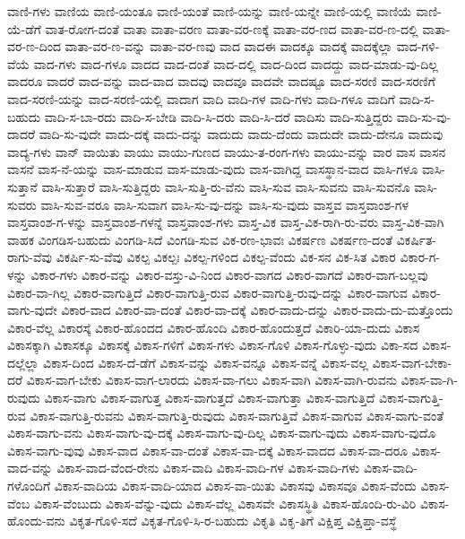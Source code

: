 {ವಾಣಿ-ಗಳು
ವಾಣಿಯ
ವಾಣಿ-ಯಂತೂ
ವಾಣಿ-ಯಂತೆ
ವಾಣಿ-ಯನ್ನು
ವಾಣಿ-ಯನ್ನೇ
ವಾಣಿ-ಯಲ್ಲಿ
ವಾಣಿಯೆ
ವಾಣಿ-ಯೆ-ಡೆಗೆ
ವಾತ-ರೋಗ-ದಂತೆ
ವಾತಾ
ವಾತಾ-ವರಣ
ವಾತಾ-ವರ-ಣಕ್ಕೆ
ವಾತಾ-ವರ-ಣದ
ವಾತಾ-ವರ-ಣ-ದಲ್ಲಿ
ವಾತಾ-ವರ-ಣ-ದಿಂದ
ವಾತಾ-ವರ-ಣ-ವನ್ನು
ವಾತಾ-ವರ-ಣವು
ವಾದ
ವಾದಈ
ವಾದಕ್ಕೂ
ವಾದಕ್ಕೆ
ವಾದಕ್ಕೆಲ್ಲಾ
ವಾದ-ಗಳಿ-ವೆಯೆ
ವಾದ-ಗಳು
ವಾದ-ಗಳೂ
ವಾದದ
ವಾದ-ದಂತೆ
ವಾದ-ದಲ್ಲಿ
ವಾದ-ದಿಂದ
ವಾದದ್ದು
ವಾದ-ಮಾಡು-ವು-ದಿಲ್ಲ
ವಾದರೂ
ವಾದರೆ
ವಾದ-ವನ್ನು
ವಾದ-ವಾದ
ವಾದವು
ವಾದವೂ
ವಾದವೇ
ವಾದಷ್ಟೂ
ವಾದ-ಸರಣಿ
ವಾದ-ಸರಣಿಗೆ
ವಾದ-ಸರಣಿ-ಯನ್ನು
ವಾದ-ಸರಣಿ-ಯಲ್ಲಿ
ವಾದಾಗ
ವಾದಿ
ವಾದಿ-ಗಳ
ವಾದಿ-ಗಳು
ವಾದಿ-ಗಳೂ
ವಾದಿಗೆ
ವಾದಿ-ಸ-ಬಹುದು
ವಾದಿ-ಸ-ಬಾ-ರದು
ವಾದಿ-ಸ-ಬೇಡಿ
ವಾದಿ-ಸಿ-ದರು
ವಾದಿ-ಸಿ-ದರೆ
ವಾದಿಸು
ವಾದಿ-ಸುತ್ತಿದ್ದರು
ವಾದಿ-ಸು-ವು-ದಾದರೆ
ವಾದಿ-ಸು-ವುದೇ
ವಾದು-ದಕ್ಕೆ
ವಾದು-ದನ್ನು
ವಾದುದು
ವಾದು-ದೆಂದು
ವಾದುದೇ
ವಾದು-ದೇನೂ
ವಾದುವು
ವಾದ್ಯ-ಗಳು
ವಾನ್
ವಾಯಿತು
ವಾಯು
ವಾಯು-ಗುಣದ
ವಾಯು-ತ-ರಂಗ-ಗಳು
ವಾಯು-ವನ್ನು
ವಾರ
ವಾಸ
ವಾಸನ
ವಾಸನೆ
ವಾಸ-ನೆ-ಯನ್ನು
ವಾಸ-ಮಾಡುವ
ವಾಸ-ಮಾಡು-ವುದು
ವಾಸ-ವಾಗಿದ್ದ
ವಾಸಸ್ಥಾನ-ವಾದ
ವಾಸಿ-ಗಳೂ
ವಾಸಿ-ಸುತ್ತಾನೆ
ವಾಸಿ-ಸುತ್ತಾರೆ
ವಾಸಿ-ಸುತ್ತಿದ್ದರು
ವಾಸಿ-ಸುತ್ತಿ-ರು-ವೆನು
ವಾಸಿ-ಸುವ
ವಾಸಿ-ಸುವನು
ವಾಸಿ-ಸುವನೊ
ವಾಸಿ-ಸುವರು
ವಾಸಿ-ಸುವ-ವರೂ
ವಾಸಿ-ಸುವಾಗ
ವಾಸಿ-ಸು-ವು-ದನ್ನು
ವಾಸಿ-ಸು-ವುದು
ವಾಸ್ತವ
ವಾಸ್ತವಾಂಶ-ಗಳ
ವಾಸ್ತವಾಂಶ-ಗ-ಳನ್ನು
ವಾಸ್ತವಾಂಶ-ಗಳನ್ನೆ
ವಾಸ್ತವಾಂಶ-ಗಳು
ವಾಸ್ತ-ವಿಕ
ವಾಸ್ತ-ವಿಕ-ರಾಗಿ-ರು-ವರು
ವಾಸ್ತ-ವಿಕ-ವಾಗಿ
ವಾಹಕ
ವಿಂಗಡಿಸ-ಬಹುದು
ವಿಂಗಡಿ-ಸಿದೆ
ವಿಂಗಡಿ-ಸುವ
ವಿಕ-ರಣ-ಭಾವಃ
ವಿಕರ್ಷಣ
ವಿಕರ್ಷಣ-ದಂತೆ
ವಿಕರ್ಷಿತ-ರಾಗು-ವೆವು
ವಿಕರ್ಷಿ-ಸು-ವೆವು
ವಿಕಲ್ಪ
ವಿಕಲ್ಪಃ
ವಿಕಲ್ಪ-ಗಳಿಂದ
ವಿಕಲ್ಪ-ವೆಂದು
ವಿಕ-ಸನ
ವಿಕ-ಸಿತ
ವಿಕಾರ
ವಿಕಾರ-ಗ-ಳನ್ನು
ವಿಕಾರ-ಗಳು
ವಿಕಾರ-ವನ್ನು
ವಿಕಾರ-ವಸ್ತು-ವಿ-ನಿಂದ
ವಿಕಾರ-ವಾಗದ
ವಿಕಾರ-ವಾಗದೆ
ವಿಕಾರ-ವಾಗ-ಬಲ್ಲವು
ವಿಕಾರ-ವಾ-ಗಿಲ್ಲ
ವಿಕಾರ-ವಾಗುತ್ತಿದೆ
ವಿಕಾರ-ವಾಗುತ್ತಿ-ರುವ
ವಿಕಾರ-ವಾಗುತ್ತಿ-ರುವು-ದನ್ನು
ವಿಕಾರ-ವಾಗುವ
ವಿಕಾರ-ವಾಗು-ವುದೇ
ವಿಕಾರ-ವಾದ
ವಿಕಾರ-ವಾ-ದಂತೆ
ವಿಕಾರ-ವಾ-ದಕ್ಕೆ
ವಿಕಾರ-ವಾದು-ದನ್ನು
ವಿಕಾರ-ವಾದು-ದು-ಮತ್ತೊಂದು
ವಿಕಾರ-ವೆಲ್ಲ
ವಿಕಾರಸ್ಕೆ
ವಿಕಾರ-ಹೊಂದದ
ವಿಕಾರ-ಹೊಂದಿ
ವಿಕಾರ-ಹೊಂದುತ್ತದೆ
ವಿಕಾರಿ-ಯಾ-ದುದು
ವಿಕಾಸ
ವಿಕಾಸಕ್ಕಾಗಿ
ವಿಕಾಸಕ್ಕೂ
ವಿಕಾಸಕ್ಕೆ
ವಿಕಾಸ-ಗಳಿಗೆ
ವಿಕಾಸ-ಗಳು
ವಿಕಾಸ-ಗೊಳಿ
ವಿಕಾಸ-ಗೊಳ್ಳು-ವುದು
ವಿಕಾ-ಸದ
ವಿಕಾಸ-ದಲ್ಲೆಲ್ಲಾ
ವಿಕಾಸ-ದಿಂದ
ವಿಕಾಸ-ದೆ-ಡೆಗೆ
ವಿಕಾಸ-ವನ್ನು
ವಿಕಾಸ-ವನ್ನೂ
ವಿಕಾಸ-ವನ್ನೆ
ವಿಕಾಸ-ವಲ್ಲ
ವಿಕಾಸ-ವಾಗ-ಬೇಕಾ-ದರೆ
ವಿಕಾಸ-ವಾಗ-ಬೇಕು
ವಿಕಾಸ-ವಾಗ-ಲಾರದು
ವಿಕಾಸ-ವಾ-ಗಲು
ವಿಕಾಸ-ವಾಗಿ
ವಿಕಾಸ-ವಾಗಿ-ರುವನು
ವಿಕಾಸ-ವಾ-ಗಿ-ರುವುದು
ವಿಕಾಸ-ವಾಗು
ವಿಕಾಸ-ವಾಗುತ್ತ
ವಿಕಾಸ-ವಾಗುತ್ತದೆ
ವಿಕಾಸ-ವಾಗುತ್ತಾ
ವಿಕಾಸ-ವಾಗುತ್ತಿದೆ
ವಿಕಾಸ-ವಾಗುತ್ತಿ-ರುವ
ವಿಕಾಸ-ವಾಗುತ್ತಿ-ರುವನು
ವಿಕಾಸ-ವಾಗುತ್ತಿ-ರುವುದು
ವಿಕಾಸ-ವಾಗುತ್ತಿವೆ
ವಿಕಾಸ-ವಾಗುವ
ವಿಕಾಸ-ವಾಗು-ವಂತೆ
ವಿಕಾಸ-ವಾಗು-ವನು
ವಿಕಾಸ-ವಾಗು-ವು-ದಕ್ಕೆ
ವಿಕಾಸ-ವಾಗು-ವು-ದಿಲ್ಲ
ವಿಕಾಸ-ವಾಗು-ವುದು
ವಿಕಾಸ-ವಾಗು-ವುದೊ
ವಿಕಾಸ-ವಾಗು-ವುವು
ವಿಕಾಸ-ವಾದ
ವಿಕಾಸ-ವಾ-ದಂತೆ
ವಿಕಾಸ-ವಾ-ದಕ್ಕೆ
ವಿಕಾಸ-ವಾದದ
ವಿಕಾಸ-ವಾ-ದರೂ
ವಿಕಾಸ-ವಾದ-ವನ್ನು
ವಿಕಾಸ-ವಾದ-ವೆಂದ-ರೇನು
ವಿಕಾಸ-ವಾದಿ
ವಿಕಾಸ-ವಾದಿ-ಗಳ
ವಿಕಾಸ-ವಾದಿ-ಗಳು
ವಿಕಾಸ-ವಾದಿ-ಗಳೊಂದಿಗೆ
ವಿಕಾಸ-ವಾದಿಯ
ವಿಕಾಸ-ವಾದಿ-ಯಾದ
ವಿಕಾಸ-ವಾ-ಯಿತು
ವಿಕಾಸವು
ವಿಕಾಸವೂ
ವಿಕಾಸ-ವೆಂದು
ವಿಕಾಸ-ವೆಂಬ
ವಿಕಾಸ-ವೆಂಬುದು
ವಿಕಾಸ-ವೆನ್ನು-ವುದು
ವಿಕಾಸ-ವೆಲ್ಲ
ವಿಕಾಸವೇ
ವಿಕಾಸಸ್ಥಿತಿ
ವಿಕಾಸ-ಹೊಂದಿ-ರು-ವಿರಿ
ವಿಕಾಸ-ಹೊಂದು-ವನು
ವಿಕೃತ-ಗೊಳಿ-ಸದೆ
ವಿಕೃತ-ಗೊಳಿ-ಸಿ-ರ-ಬಹುದು
ವಿಕೃತಿ
ವಿಕೃ-ತಿಗೆ
ವಿಕ್ಷಿಪ್ತ
ವಿಕ್ಷಿಪ್ತಾ-ವಸ್ಥೆ
}
